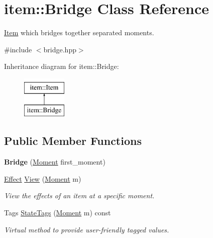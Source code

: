 \hypertarget{classitem_1_1_bridge}{}\section{item\+:\+:Bridge Class Reference}
\label{classitem_1_1_bridge}


\hyperlink{classitem_1_1_item}{Item} which bridges together separated moments.  




{\ttfamily \#include $<$bridge.\+hpp$>$}

Inheritance diagram for item\+:\+:Bridge\+:\begin{figure}[H]
\begin{center}
\leavevmode
\includegraphics[height=2.000000cm]{classitem_1_1_bridge}
\end{center}
\end{figure}
\subsection*{Public Member Functions}
\begin{DoxyCompactItemize}
\item 
\mbox{\label{classitem_1_1_bridge_a5bc97b39c3fcb52578942f5f41d7bb7d}} 
{\bfseries Bridge} (\hyperlink{classtimeplane_1_1_moment}{Moment} first\+\_\+moment)
\item 
\hyperlink{classitem_1_1_effect}{Effect} \hyperlink{classitem_1_1_bridge_a7d579da1f368ba6a6b5dfd41de833f17}{View} (\hyperlink{classtimeplane_1_1_moment}{Moment} m)
\begin{DoxyCompactList}\small\item\em View the effects of an item at a specific moment. \end{DoxyCompactList}\item 
Tags \hyperlink{classitem_1_1_bridge_af49adc6bbaf4788cce2b4cbf8d895865}{State\+Tags} (\hyperlink{classtimeplane_1_1_moment}{Moment} m) const
\begin{DoxyCompactList}\small\item\em Virtual method to provide user-\/friendly tagged values. \end{DoxyCompactList}\end{DoxyCompactItemize}

